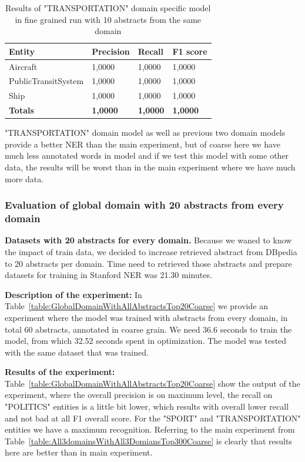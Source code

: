 \documentclass[thesis=M,english]{FITthesis}[2018/05/30]
\begin{document}
	\begin{table}[H]\centering
		\begin{tabular}{|l|l|l|l|}
			\hline {\textbf{Entity}} & {\textbf{Precision}} & {\textbf{Recall}} & {\textbf{F1 score}}\\\hline
				Aircraft & 1,0000 & 1,0000 & 1,0000\\
				PublicTransitSystem & 1,0000 & 1,0000 & 1,0000\\
				Ship & 1,0000 & 1,0000 & 1,0000\\\hline
				\textbf{Totals} & \textbf{1,0000} & \textbf{1,0000} & \textbf{1,0000}\\\hline
		\end{tabular}
		\caption{Results of "TRANSPORTATION" domain specific model in fine grained run with 10 abstracts from the same domain \label{table:TransportationDomainWithTransportationTop10Fine}}
	\end{table}

	"TRANSPORTATION" domain model as well as previous two domain models provide a better NER than the main experiment, but of coarse here we have much less annotated words in model and if we test this model with some other data, the results will be worst than in the main experiment where we have much more data.
	
\subsubsection{Evaluation of global domain with 20 abstracts from every domain }
\textbf{Datasets with 20 abstracts for every domain.} Because we waned to know the impact of train data, we decided to increase retrieved abstract from DBpedia to 20 abstracts per domain. Time need to retrieved those abstracts and prepare datasets for training in Stanford NER was 21.30 minutes.

\textbf{Description of the experiment:} In Table~\ref{table:GlobalDomainWithAllAbstractsTop20Coarse} we provide an experiment where the model was trained with abstracts from every domain, in total 60 abstracts, annotated in coarse grain. We need 36.6 seconds to train the model, from which 32.52 seconds spent in optimization. The model was tested with the same dataset that was trained.    

\textbf{Results of the experiment:} Table~\ref{table:GlobalDomainWithAllAbstractsTop20Coarse} show the output of the experiment, where the overall precision is on maximum level, the recall on "POLITICS" entities is a little bit lower, which results with overall lower recall and not bad at all F1 overall score. For the "SPORT" and "TRANSPORTATION" entities we have a maximum recognition. Referring to the main experiment from Table~\ref{table:All3domainsWithAll3DomiansTop300Coarse} is clearly that results here are better than in main experiment.
\end{document}

